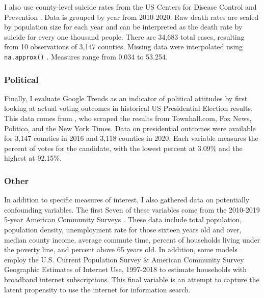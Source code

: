 I also use county-level suicide rates from the US Centers for Disease Control
and Prevention \citeyearpar{suic_data}. Data is grouped by year from 2010-2020. Raw death
rates are scaled by population size for each year and can be interpreted as the
death rate by suicide for every one thousand people. There are 34,683 total
cases, resulting from 10 observations of 3,147 counties. Missing data were interpolated using
\texttt{na.approx()} \citep{zoo}. Measures range from 0.034 to 53.254.

\subsubsection{Political}

Finally, I evaluate Google Trends as an indicator of political
attitudes by first looking at actual voting outcomes in historical US
Presidential Election results. This data comes from  \citet{pres_data}, who scraped the
results from Townhall.com, Fox News, Politico, and the New York Times. Data on 
presidential outcomes were available for 3,147 counties in 2016 and
3,118 counties in 2020. Each variable measures the percent of votes
for the candidate, with the lowest percent at 3.09\% and the highest at 92.15\%.



\subsubsection{Other}

In addition to specific measures of interest, I also gathered data on potentially
confounding variables. The first Seven of these
variables come from the 2010-2019 5-year American Community Surveys
\citep{acs2019, acs2018, acs2017, acs2016, acs2015, acs2014, acs2013, acs2012, acs2011, acs2010}. 
These data include total population, population density,
unemployment rate for those sixteen years old and over, median county income, average commute
time, percent of households living under the poverty line, and percent above 65
years old. In addition, some models employ the U.S. Current Population Survey \&
American Community Survey Geographic Estimates of Internet Use, 1997-2018
\citep{internet_use} to estimate households with broadband internet subscriptions.
This final variable is an attempt to capture the latent propensity to use the
internet for information search.

